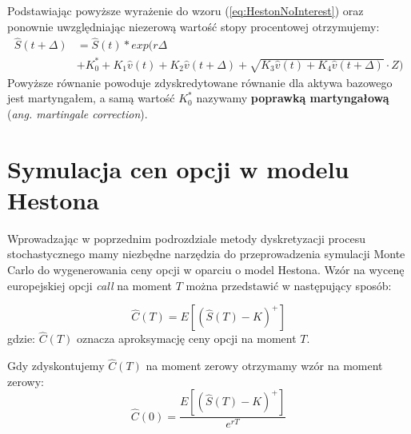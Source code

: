 \documentclass{pracamgr}
\begin{document}
Podstawiając powyższe wyrażenie do wzoru (\ref{eq:HestonNoInterest}) oraz ponownie uwzględniając
niezerową wartość stopy procentowej otrzymujemy:
\begin{equation}
\begin{aligned}
\label{eq:HestonInterestMartingale} 
\hat{S}(t + \Delta) &= \hat{S}(t) * exp(r \Delta\\ 
                    &+ K_0^* + K_1 \hat{v}(t) 
                    + K_2 \hat{v}(t+\Delta)
                    + \sqrt{K_3 \hat{v}(t) +  K_4 \hat{v}(t+\Delta)} \cdot Z)

\end{aligned}
\end{equation}
Powyższe równanie powoduje zdyskredytowane równanie dla aktywa bazowego jest martyngałem, a samą
wartość $K_0^*$ nazywamy \textbf{poprawką martyngałową} (\textit{ang. martingale correction}).


\section{Symulacja cen opcji w modelu Hestona}

Wprowadzając w poprzednim podrozdziale metody dyskretyzacji procesu stochastycznego mamy niezbędne 
narzędzia do przeprowadzenia symulacji Monte Carlo do wygenerowania ceny opcji w oparciu o model 
Hestona.
Wzór na wycenę europejskiej opcji \textit{call} na moment $T$ można przedstawić w następujący sposób:

\begin{equation}
  \hat{C}(T) = E \left[ (\hat{S}(T) - K)^{+}  \right]
\end{equation}
gdzie: $\hat{C}(T)$ oznacza aproksymację ceny opcji na moment $T$.


Gdy zdyskontujemy $\hat{C}(T)$ na moment zerowy otrzymamy wzór na moment zerowy:
\begin{equation}
  \hat{C}(0) = \frac{E \left[ (\hat{S}(T) - K)^{+} \right]}{e^{rT}} 
\end{equation}


\end{document}
